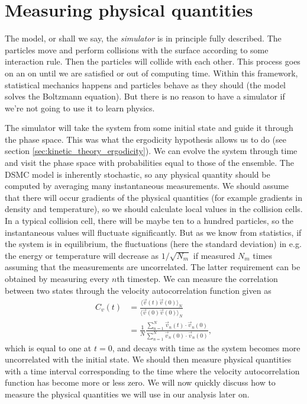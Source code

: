 \section{Measuring physical quantities}
\label{sec:dsmc_measuring_physical_quantities}
The model, or shall we say, the \textit{simulator} is in principle fully described. The particles move and perform collisions with the surface according to some interaction rule. Then the particles will collide with each other. This process goes on an on until we are satisfied or out of computing time. Within this framework, statistical mechanics happens and particles behave as they should (the model solves the Boltzmann equation). But there is no reason to have a simulator if we're not going to use it to learn physics.

The simulator will take the system from some initial state and guide it through the phase space. This was what the ergodicity hypothesis allows us to do (see section \ref{sec:kinetic_theory_ergodicity}). We can evolve the system through time and visit the phase space with probabilities equal to those of the ensemble. The DSMC model is inherently stochastic, so any physical quantity should be computed by averaging many instantaneous measurements. We should assume that there will occur gradients of the physical quantities (for example gradients in density and temperature), so we should calculate local values in the collision cells. In a typical collision cell, there will be maybe ten to a hundred particles, so the instantaneous values will fluctuate significantly. But as we know from statistics, if the system is in equilibrium, the fluctuations (here the standard deviation) in e.g. the energy or temperature will decrease as $1/\sqrt{N_m}$ if measured $N_m$ times assuming that the measurements are uncorrelated. The latter requirement can be obtained by measuring every $n$th timestep. We can measure the correlation between two states through the velocity autocorrelation function given as
\begin{align}
	C_v(t) &= \frac{\langle \vec v(t)\vec v(0)\rangle_N}{\langle \vec v(0)\vec v(0)\rangle_N}\\
	&= \frac{1}{N}\frac{\sum_{n=1}^N \vec v_n(t)\cdot\vec v_n(0)}{\sum_{n=1}^N \vec v_n(0)\cdot\vec v_n(0)},
\end{align}
which is equal to one at $t=0$, and decays with time as the system becomes more uncorrelated with the initial state. We should then measure physical quantities with a time interval corresponding to the time where the velocity autocorrelation function has become more or less zero. We will now quickly discuss how to measure the physical quantities we will use in our analysis later on. 
